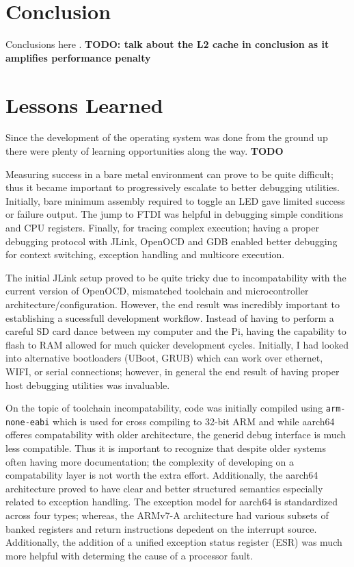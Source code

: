 \documentclass[11pt]{article}
\begin{document}
\section{Conclusion}
\label{sec:conclusion}

Conclusions here \cite{freebsd} \cite{unix}.
\textbf{TODO: talk about the L2 cache in conclusion as it amplifies performance penalty}

\section{Lessons Learned}
\label{sec:lessons}
Since the development of the operating system was done from the ground up there were plenty of learning opportunities along the way. 
\textbf{TODO} 

Measuring success in a bare metal environment can prove to be quite difficult; thus it became important to progressively escalate to better debugging utilities.  Initially, bare minimum assembly required to toggle an LED gave limited success or failure output.  The jump to FTDI was helpful in debugging simple conditions and CPU registers.  Finally, for tracing complex execution; having a proper debugging protocol with JLink, OpenOCD and GDB enabled better debugging for context switching, exception handling and multicore execution.

The initial JLink setup proved to be quite tricky due to incompatability with the current version of OpenOCD, mismatched toolchain and microcontroller architecture/configuration.  However, the end result was incredibly important to establishing a sucessfull development workflow.  Instead of having to perform a careful SD card dance between my computer and the Pi, having the capability to flash to RAM allowed for much quicker development cycles.  Initially, I had looked into alternative bootloaders (UBoot, GRUB) which can work over ethernet, WIFI, or serial connections; however, in general the end result of having proper host debugging utilities was invaluable.

On the topic of toolchain incompatability, code was initially compiled using \texttt{arm-none-eabi} which is used for cross compiling to 32-bit ARM and while aarch64 offeres compatability with older architecture, the generid debug interface is much less compatible.  Thus it is important to recognize that despite older systems often having more documentation; the complexity of developing on a compatability layer is not worth the extra effort.  Additionally, the aarch64 architecture proved to have clear and better structured semantics especially related to exception handling.  The exception model for aarch64 is standardized across four types; whereas, the ARMv7-A architecture had various subsets of banked registers and return instructions depedent on the interrupt source.  Additionally, the addition of a unified exception status register (ESR) was much more helpful with determing the cause of a processor fault.
\end{document}
